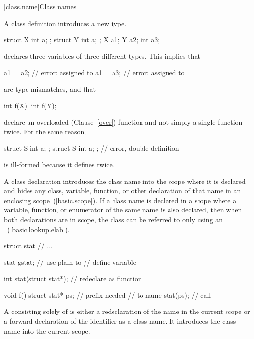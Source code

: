 [class.name]{Class names}
%
%
%

\pnum
A class definition introduces a new type.
\enterexample

\begin{codeblock}
struct X { int a; };
struct Y { int a; };
X a1;
Y a2;
int a3;
\end{codeblock}

declares three variables of three different types. This implies that

\begin{codeblock}
a1 = a2;                        // error:  assigned to 
a1 = a3;                        // error:  assigned to 
\end{codeblock}

are type mismatches, and that

\begin{codeblock}
int f(X);
int f(Y);
\end{codeblock}

%
declare an overloaded (Clause~\ref{over}) function  and not
simply a single function  twice. For the same reason,

\begin{codeblock}
struct S { int a; };
struct S { int a; };            // error, double definition
\end{codeblock}

is ill-formed because it defines  twice.
\exitexample

\pnum
{}%
%
A class declaration introduces the class name into the scope where
%
it is declared and hides any
class, variable, function, or other declaration of that name in an
enclosing scope~(\ref{basic.scope}). If a class name is declared in a
scope where a variable, function, or enumerator of the same name is also
declared, then when both declarations are in scope, the class can be
referred to only using an
~(\ref{basic.lookup.elab}).
\enterexample

\begin{codeblock}
struct stat {
  // ...
};

stat gstat;                     // use plain  to
                                // define variable

int stat(struct stat*);         // redeclare  as function

void f() {
  struct stat* ps;              //  prefix needed
                                // to name 
  stat(ps);                     // call 
}
\end{codeblock}
\exitexample
{}%
%
A  consisting solely of  is either a redeclaration of the name in the current scope
or a forward declaration of the identifier as a class name. It
introduces the class name into the current scope.
\enterexample

